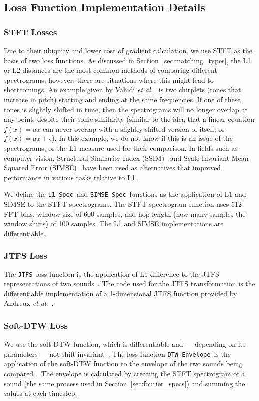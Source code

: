 \documentclass[lettersize,journal]{IEEEtran}
\newcommand{\SIMSESpec}{\texttt{SIMSE\_Spec}}
\newcommand{\LoneSpec}{\texttt{L1\_Spec}}
\newcommand{\JTFS}{\texttt{JTFS}}
\newcommand{\DTWEnv}{\texttt{DTW\_Envelope}}
\begin{document}
\subsection{Loss Function Implementation Details}
\label{sec:loss_implementation}
\subsubsection{STFT Losses}
Due to their ubiquity and lower cost of gradient calculation, we use STFT as the basis of two loss functions. As discussed in Section~\ref{sec:matching_types}, the L1 or L2 distances are the most common methods of comparing different spectrograms, however, there are situations where this might lead to shortcomings. An example given by Vahidi \textit{et al.}~\cite{vahidi2023mesostructures} is two chirplets (tones that increase in pitch) starting and ending at the same frequencies. If one of these tones is slightly shifted in time, then the spectrograms will no longer overlap at any point, despite their sonic similarity (similar to the idea that a linear equation $f(x) = ax$ can never overlap with a slightly shifted version of itself, or $f(x) = ax +\epsilon$). In this example, we do not know if this is an issue of the spectrograms, or the L1 measure used for their comparison. In fields such as computer vision, Structural Similarity Index (SSIM)~\cite{wang2004imagesssim,wang2009mean} and Scale-Invariant Mean Squared Error (SIMSE)~\cite{barron2014shapessimse} have been used as alternatives that improved performance in various tasks relative to L1.

We define the \LoneSpec~and \SIMSESpec~functions as the application of L1 and SIMSE to the STFT spectrograms. The STFT spectrogram function uses 512 FFT bins, window size of 600 samples, and hop length (how many samples the window shifts) of 100 samples. The L1 and SIMSE implementations are differentiable. 

\subsubsection{JTFS Loss}
The \JTFS~loss function is the application of L1 difference to the JTFS representations of two sounds~\cite{vahidi2023mesostructures}. The code used for the JTFS transformation is the differentiable implementation of a 1-dimensional JTFS function provided by Andreux \textit{et al.}~\cite{kymatio}.

\subsubsection{Soft-DTW Loss}
We use the soft-DTW function, which is differentiable and --- depending on its parameters --- not shift-invariant~\cite{cuturi2017soft,janati2020spatio,tavenard.blog.softdtw}. The loss function \DTWEnv~is the application of the soft-DTW function to the envelope of the two sounds being compared~\cite{lyons1997understanding}. The envelope is calculated by creating the STFT spectrogram of a sound (the same process used in Section~\ref{sec:fourier_specs}) and summing the values at each timestep. 
\end{document}
